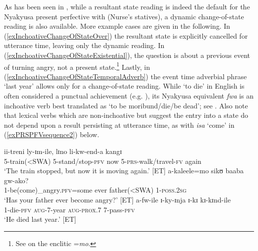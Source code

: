 \newpage 
As has been seen in , while a resultant state reading is indeed the default for the Nyakyusa present perfective with  (Nurse’s statives), a dynamic change-of-state reading is also available. More example cases are given in the following. In (\ref{exInchoativeChangeOfStateOver}) the resultant state is explicitly cancelled for utterance time, leaving only the dynamic reading. In (\ref{exInchoativeChangeOfStateExistential}), the question is about a previous event of turning angry, not a present state.\footnote{See  on the enclitic =\textit{mo}.} Lastly, in (\ref{exInchoativeChangeOfStateTemporalAdverb}) the event time adverbial phrase \lq last year' allows only for a change-of-state reading. While \lq to die' in English is often considered a punctual achievement (e.g. \citealt[54]{DowtyD1979}), its Nyakyusa equivalent \textit{fwa} is an inchoative verb best translated as \lq to be moribund/die/be dead'; see . Also note that lexical verbs which are non-inchoative but suggest the entry into a state do not depend upon a result persisting at utterance time, as with \textit{isa} \lq come' in (\ref{exPRSPFVsequence2}) below.

\begin{exe}
\ex \label{exInchoativeChangeOfStateOver}\gll ii-treni ly-ɪm-ile, lɪno li-kw-end-a kangɪ\\
5-train(<SWA) 5-stand/stop-\textsc{pfv} now 5-\textsc{prs}-walk/travel-\textsc{fv} again\\
\glt \lq The train stopped, but now it is moving again.' [ET]
\ex \label{exInchoativeChangeOfStateExistential} \gll a-kaleele=mo sikʊ baaba gw-ako?\\ 1-be(come)\_angry.\textsc{pfv}=some ever father(<SWA) 1-\textsc{poss.2sg}\\\glt `Has your father ever become angry?' [ET] %
\ex \label{exInchoativeChangeOfStateTemporalAdverb} \gll a-fw-ile ɪ-ky-ɪnja ɪ-kɪ kɪ-kɪnd-ile\\
1-die-\textsc{pfv} \textsc{aug}-7-year \textsc{aug}-\textsc{prox.7} 7-pass-\textsc{pfv}\\
\glt `He died last year.' [ET]
\end{exe}

